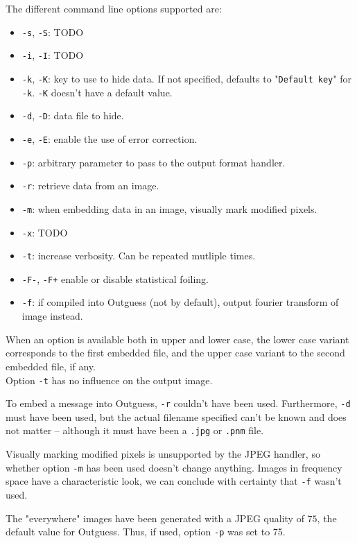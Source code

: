 \documentclass{article}
\begin{document}
The different command line options supported are:
\begin{itemize}
	\item \texttt{-s}, \texttt{-S}: {\color{red} TODO}
	\item \texttt{-i}, \texttt{-I}: {\color{red} TODO}
	\item \texttt{-k}, \texttt{-K}: key to use to hide data. If not specified, defaults to "\texttt{Default key}" for \texttt{-k}. \texttt{-K} doesn't have a default value.
	\item \texttt{-d}, \texttt{-D}: data file to hide.
	\item \texttt{-e}, \texttt{-E}: enable the use of error correction.
	\item \texttt{-p}: arbitrary parameter to pass to the output format handler.
	\item \texttt{-r}: retrieve data from an image.
	\item \texttt{-m}: when embedding data in an image, visually mark modified pixels.
	\item \texttt{-x}: {\color{red} TODO}
	\item \texttt{-t}: increase verbosity. Can be repeated mutliple times.
	\item \texttt{-F-}, \texttt{-F+} enable or disable statistical foiling.
	\item \texttt{-f}: if compiled into Outguess (not by default), output fourier transform of image instead.
\end{itemize}

When an option is available both in upper and lower case, the lower case variant corresponds to the first embedded file, and the upper case variant to the second embedded file, if any. \\

Option \texttt{-t} has no influence on the output image.

To embed a message into Outguess, \texttt{-r} couldn't have been used. Furthermore, \texttt{-d} must have been used, but the actual filename specified can't be known and does not matter -- although it must have been a \texttt{.jpg} or \texttt{.pnm} file.

Visually marking modified pixels is unsupported by the JPEG handler, so whether option \texttt{-m} has been used doesn't change anything. Images in frequency space have a characteristic look, we can conclude with certainty that \texttt{-f} wasn't used.

The "everywhere" images have been generated with a JPEG quality of $75$, the default value for Outguess. Thus, if used, option \texttt{-p} was set to 75.
\end{document}
